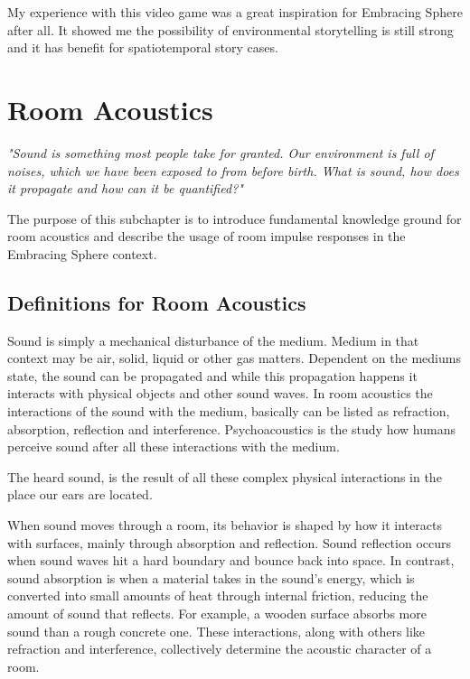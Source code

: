            My experience with this video game was a great inspiration for Embracing Sphere after all. It showed me the possibility of environmental storytelling is still strong and it has benefit for spatiotemporal story cases.
            \section{Room Acoustics}
        \emph{"Sound is something most people take for granted. Our environment is full of noises, which we have been exposed to from before birth. What is sound, how does it propagate and how can it be quantified\cite{Acoustics_and_Psychophysics}?"}\par 

        The purpose of this subchapter is to introduce fundamental knowledge ground for room acoustics and describe the usage of room impulse responses in the Embracing Sphere context.\par
        \subsection{Definitions for Room Acoustics}
            Sound is simply a mechanical disturbance of the medium. Medium in that context may be air, solid, liquid or other gas matters. Dependent on the mediums state, the sound can be propagated and while this propagation happens it interacts with physical objects and other sound waves. In room acoustics the interactions of the sound with the medium, basically can be listed as refraction, absorption, reflection and interference. Psychoacoustics is the study how humans perceive sound after all these interactions with the medium\cite{Acoustics_and_Psychophysics}.\par

            The heard sound, is the result of all these complex physical interactions in the place our ears are located.\par

            When sound moves through a room, its behavior is shaped by how it interacts with surfaces, mainly through absorption and reflection. Sound reflection occurs when sound waves hit a hard boundary and bounce back into space. In contrast, sound absorption is when a material takes in the sound's energy, which is converted into small amounts of heat through internal friction, reducing the amount of sound that reflects\cite{Acoustics_and_Psychophysics}. For example, a wooden surface absorbs more sound than a rough concrete one. These interactions, along with others like refraction and interference, collectively determine the acoustic character of a room.\par

